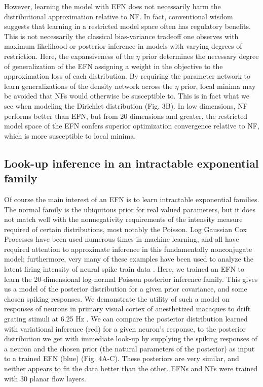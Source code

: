 \documentclass[twoside]{article}
\begin{document}
However, learning the model with EFN does not necessarily harm the distributional approximation relative to NF.  In fact, conventional wisdom suggests that learning in a restricted model space often has regulatory benefits.  This is not necessarily the classical bias-variance tradeoff one observes with maximum likelihood or posterior inference in models with varying degrees of restriction.  Here, the expansiveness of the $\eta$ prior determines the necessary degree of generalization of the EFN assigning a weight in the objective to the approximation loss of each distribution.  By requiring the parameter network to learn generalizations of the density network across the $\eta$ prior,  local minima may be avoided that NFs would otherwise be susceptible to.  This is in fact what we see when modeling the Dirichlet distribution (Fig. 3B).  In low dimensions, NF performs better than EFN, but from 20 dimensions and greater, the restricted model space of the EFN confers superior optimization convergence relative to NF, which is more susceptible to local minima.


\subsection{Look-up inference in an intractable exponential family}

Of course the main interest of an EFN is to learn intractable exponential families.  The normal family is the ubiquitous prior for real valued parameters, but it does not match well with the nonnegativity requirements of the intensity measure required of certain distributions, most notably the Poisson.  Log Gaussian Cox Processes have been used numerous times in machine learning, and all have required attention to approximate inference in this fundamentally nonconjugate model; furthermore, very many of these examples have been used to analyze the latent firing intensity of neural spike train data \citep{cunningham2008fast,cunningham2008inferring,adams2009tractable,gao2016linear}.
Here, we trained an EFN to learn the 20-dimensional log-normal Poisson posterior inference family.  This gives us a model of the posterior distribution for a given prior covariance, and some chosen spiking responses.  We demonstrate the utility of such a model on responses of neurons in primary visual cortex of anesthetized macaques to drift grating stimuli at 6.25 Hz \citep{smith2008spatial}.  We can compare the posterior distribution learned with variational inference (red) for a given neuron’s response, to the posterior distribution we get with immediate look-up by supplying the spiking responses of a neuron and the chosen prior (the natural parameters of the posterior) as input to a trained EFN (blue) (Fig. 4A-C).  These posteriors are very similar, and neither appears to fit the data better than the other.  EFNs and NFs were trained with 30 planar flow layers.
\end{document}
